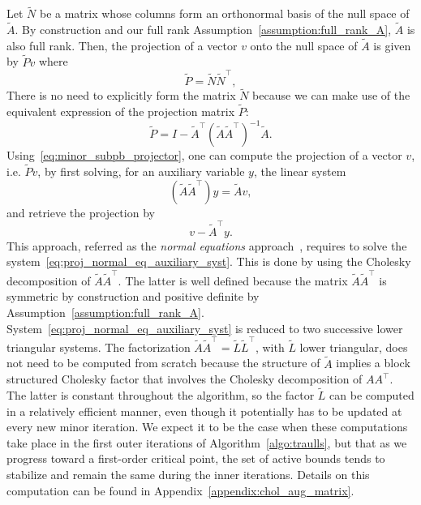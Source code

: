 Let $\tilde{N}$ be a matrix whose columns form an orthonormal basis of the null space of $\tilde{A}$. By construction and our full rank Assumption~\ref{assumption:full_rank_A}, $\tilde{A}$ is also full rank. Then, the projection of a vector $v$ onto the null space of $\tilde{A}$ is given by $\tilde{P}v$ where
\[\tilde{P} = \tilde{N}\tilde{N}^\top,\]
There is no need to explicitly form the matrix $\tilde{N}$ because we can make use of the equivalent expression of the projection matrix $\tilde{P}$:
\begin{equation}\label{eq:minor_subpb_projector}
	\tilde{P} = I - \tilde{A}^\top\left(\tilde{A}\tilde{A}^\top\right)^{-1}\tilde{A}.
\end{equation}
Using~\eqref{eq:minor_subpb_projector}, one can compute the projection of a vector $v$, i.e. $\tilde{P}v$, by first solving, for an auxiliary variable $y$, the linear system
\begin{equation}\label{eq:proj_normal_eq_auxiliary_syst}
	\left(\tilde{A}\tilde{A}^\top\right)y = \tilde{A}v,
\end{equation}
and retrieve the projection by
\begin{equation*}
	v - \tilde{A}^\top y.
\end{equation*}
This approach, referred as the \textit{normal equations} approach~\cite{gould-etal:2001}, requires to solve the system~\eqref{eq:proj_normal_eq_auxiliary_syst}. This is done by using the Cholesky decomposition of $\tilde{A}\tilde{A}^\top$. The latter is well defined because the matrix $\tilde{A}\tilde{A}^\top$ is symmetric by construction and positive definite by Assumption~\ref{assumption:full_rank_A}. System~\eqref{eq:proj_normal_eq_auxiliary_syst} is reduced to two successive lower triangular systems. The factorization $\tilde{A}\tilde{A}^\top = \tilde{L}\tilde{L}^\top$, with $\tilde{L}$ lower triangular, does not need to be computed from scratch because the structure of $\tilde{A}$ implies a block structured Cholesky factor that involves the Cholesky decomposition of $AA^\top$. The latter is constant throughout the algorithm, so the factor $\tilde{L}$ can be computed in a relatively efficient manner, even though it potentially has to be updated at every new minor iteration. We expect it to be the case when these computations take place in the first outer iterations of Algorithm~\ref{algo:traulls}, but that as we progress toward a first-order critical point, the set of active bounds tends to stabilize and remain the same during the inner iterations. Details on this computation can be found in Appendix~\ref{appendix:chol_aug_matrix}.

